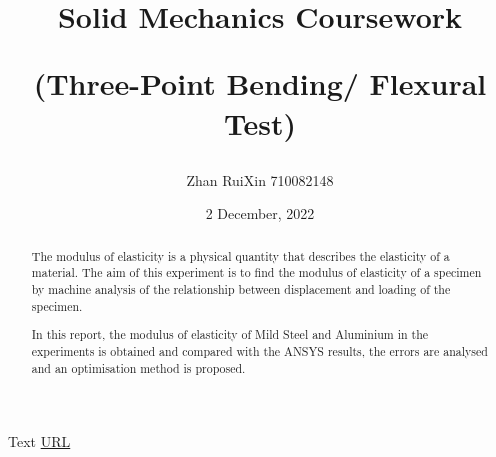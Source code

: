 \documentclass[11pt]{article}
\title{
 Solid Mechanics Coursework 
 
  (Three-Point Bending/ Flexural Test)
    }
\author{
Zhan RuiXin 710082148
}
\date{
   2 December, 2022
}
\begin{document}
\maketitle
\renewcommand{\abstractname}{\large Outline}
\begin{abstract}
	\large
The modulus of elasticity is a physical quantity that describes the elasticity of a material. The aim of this experiment is to find the modulus of elasticity of a specimen by machine analysis of the relationship between displacement and loading of the specimen. 

\noindent In this report, the modulus of elasticity of Mild Steel and Aluminium in the experiments is obtained and compared with the ANSYS results, the errors are analysed and an optimisation method is proposed.
\end{abstract}
{} %

 



%


\newpage
\begin{thebibliography}{99}
 Text
 \url{URL}
\end{thebibliography}
%
%
%
\end{document}
